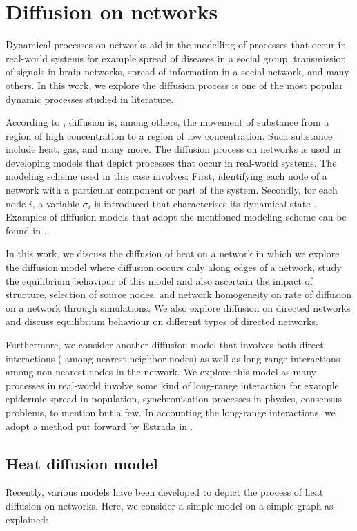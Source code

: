 \documentclass[10pt,a4paper]{article}
\theoremstyle{plain}
\theoremstyle{definition}
\begin{document}
    \newpage
    \section{Diffusion on networks}
    Dynamical processes on networks aid in the modelling of processes that occur in real-world systems for example spread of diseases in a social group, transmission of signals in brain networks, spread of information in a social network, and many others. In this work, we explore the diffusion process is one of the most popular dynamic processes studied in literature.
    
    According to \citep{newman2010networks}, diffusion is, among others, the movement of substance from a region of high concentration to a region of low concentration. Such substance include heat, gas, and many more. 
    The diffusion process on networks is used in developing models that depict processes that occur in real-world systems. The modeling scheme used in this case involves: First, identifying each node of a network with a particular component or part of the system. Secondly, for each node $i$, a variable $\sigma_i$ is introduced that characterises its dynamical state \citep{barrat2008dynamical}. Examples of diffusion models that adopt the mentioned modeling scheme can be found in \citep{estrada2011epidemic,kasprzak2012diffusion,lopez2008diffusion}. 
    
    In this work, we discuss the diffusion of heat on a network in which we explore the diffusion model where diffusion occurs only along edges of a network, study the equilibrium behaviour of this model and also ascertain the impact of structure,  selection of source nodes, and  network homogeneity on rate of diffusion on a network through simulations. We also explore diffusion on directed networks and discuss equilibrium behaviour on different types of directed networks.
    
    Furthermore, we consider another diffusion model that involves both direct interactions ( among nearest neighbor nodes) as well as long-range interactions among non-nearest nodes in the network. We explore this model as  many processes in real-world involve some kind of long-range interaction for example epidermic spread in population, synchronisation processes in physics, consensus problems, to mention but a few.
    In accounting the long-range interactions, we adopt a method put forward by Estrada in \citep{estrada2012path,estrada2017long}.
    
    
    \subsection{Heat diffusion model}
    Recently, various models have been developed to depict the process of heat diffusion on networks. Here, we consider a simple model on a simple graph as explained:
    
\end{document}
